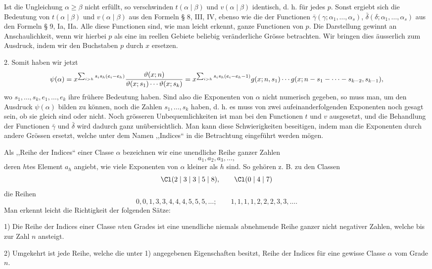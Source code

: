 Ist die Ungleichung $\alpha\ge\beta$ nicht erfüllt, so verschwinden $t(\alpha\mid\beta)$ und $v(\alpha\mid\beta)$ identisch, d. h. für jedes $p$. Sonst ergiebt sich die Bedeutung von $t(\alpha\mid\beta)$ und $v(\alpha\mid\beta)$ aus den Formeln § 8, III, IV, ebenso wie die der Functionen $\bar\gamma(\gamma;\alpha_1,\ldots,\alpha_s)$, $\bar\delta(\delta;\alpha_1,\ldots,\alpha_s)$ aus den Formeln § 9, Ia, IIa. Alle diese Functionen sind, wie man leicht erkennt, ganze Functionen von $p$. Die Darstellung gewinnt an Anschaulichkeit, wenn wir hierbei $p$ als eine im reellen Gebiete beliebig veränderliche Grösse betrachten. Wir bringen dies äusserlich zum Ausdruck, indem wir den Buchstaben $p$ durch $x$ ersetzen.

2. Somit haben wir jetzt
\[
 \psi(\alpha)=x^{\sum_{i>h}s_i s_h(e_i-e_h)}
 {\vartheta(x;n)\over \vartheta(x;s_1)\cdots\vartheta(x;s_k)}
 =x^{\sum_{i>h}s_i s_h(e_i-e_h-1)}
 g(x;n,s_1)\cdots g(x;n-s_1-\cdots-s_{k-2},s_{k-1}),
\]
wo $s_1,\ldots,s_k,e_1,\ldots,e_k$ ihre frühere Bedeutung haben. Sind also die Exponenten von $\alpha$ nicht numerisch gegeben, so muss man, um den Ausdruck $\psi(\alpha)$ bilden zu können, noch die Zahlen $s_1,\ldots,s_k$ haben, d. h. es muss von zwei aufeinanderfolgenden Exponenten noch gesagt sein, ob sie gleich sind oder nicht. Noch grösseren Unbequemlichkeiten ist man bei den Functionen $t$ und $v$ ausgesetzt, und die Behandlung der Functionen $\bar\gamma$ und $\bar\delta$ wird dadurch ganz unübersichtlich. Man kann diese Schwierigkeiten beseitigen, indem man die Exponenten durch andere Grössen ersetzt, welche unter dem Namen ,,Indices`` in die Betrachtung eingeführt werden mögen.

Als ,,Reihe der Indices`` einer Classe $\alpha$ bezeichnen wir eine unendliche Reihe ganzer Zahlen
\[
 a_1,a_2,a_3,\ldots,
\]
deren $h$tes Element $a_h$ angiebt, wie viele Exponenten von $\alpha$ kleiner als $h$ sind. So gehören z. B. zu den Classen
\[
 \Cl(2\mid3\mid3\mid5\mid8),\qquad \Cl(0\mid4\mid7)
\]
die Reihen
\[
 0,0,1,3,3,4,4,4,5,5,5,\ldots;
 \qquad
 1,1,1,1,2,2,2,3,3,\ldots.
\]
Man erkennt leicht die Richtigkeit der folgenden Sätze:

1) Die Reihe der Indices einer Classe $n$ten Grades ist eine unendliche niemals abnehmende Reihe ganzer nicht negativer Zahlen, welche bis zur Zahl $n$ ansteigt.

2) Umgekehrt ist jede Reihe, welche die unter 1) angegebenen Eigenschaften besitzt, Reihe der Indices für eine gewisse Classe $\alpha$ vom Grade $n$.

